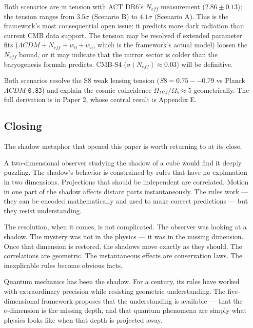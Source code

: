 \documentclass[aps,prd,preprint,superscriptaddress,longbibliography,floatfix]{revtex4-2}
\theoremstyle{remark}
\begin{document}
Both scenarios are in tension with ACT DR6's $N_{eff}$ measurement ($2.86 \pm 0.13$); the tension ranges from $3.5\sigma$ (Scenario B) to $4.1\sigma$ (Scenario A). This is the framework's most consequential open issue: it predicts more dark radiation than current CMB data support. The tension may be resolved if extended parameter fits ($\Lambda CDM + N_{eff} + w_{0} + w_a$, which is the framework's actual model) loosen the $N_{eff}$ bound, or it may indicate that the mirror sector is colder than the baryogenesis formula predicts. CMB-S4 ($\sigma(N_{eff}) \approx 0.03$) will be definitive.

Both scenarios resolve the S8 weak lensing tension ($S8 = 0.75--0.79$ vs Planck $\Lambda CDM$ \texttt{0.83}) and explain the cosmic coincidence $\Omega_{DM}/\Omega_b \approx 5$ geometrically. The full derivation is in Paper 2, whose central result is Appendix E.



\subsection{Closing}

The shadow metaphor that opened this paper is worth returning to at its close.

A two-dimensional observer studying the shadow of a cube would find it deeply puzzling. The shadow's behavior is constrained by rules that have no explanation in two dimensions. Projections that should be independent are correlated. Motion in one part of the shadow affects distant parts instantaneously. The rules work --- they can be encoded mathematically and used to make correct predictions --- but they resist understanding.

The resolution, when it comes, is not complicated. The observer was looking at a shadow. The mystery was not in the physics --- it was in the missing dimension. Once that dimension is restored, the shadows move exactly as they should. The correlations are geometric. The instantaneous effects are conservation laws. The inexplicable rules become obvious facts.

Quantum mechanics has been the shadow. For a century, its rules have worked with extraordinary precision while resisting geometric understanding. The five-dimensional framework proposes that the understanding is available --- that the e-dimension is the missing depth, and that quantum phenomena are simply what physics looks like when that depth is projected away.
\end{document}
